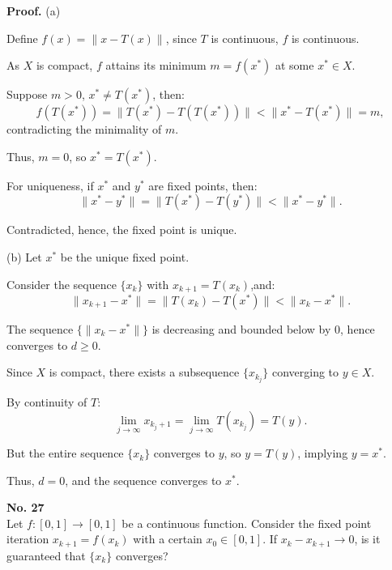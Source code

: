 \documentclass[a4paper, 11pt]{article}
\newenvironment{problem}[2][No.]
    { \begin{mdframed}[backgroundcolor=gray!5] \textbf{#1 #2} \\}
    {  \end{mdframed}}
\newenvironment{solution}
    {\textbf{Proof.}}
    {}
\begin{document}
\begin{solution}
	(a)
	
	Define \( f(x) = \| x - T(x) \| \), since \( T \) is continuous, \( f \) is continuous. 
	
	As \( X \) is compact, \( f \) attains its minimum \( m = f(x^*) \) at some \( x^* \in X \).
	
	Suppose \( m > 0 \),  \( x^* \neq T(x^*) \), then:
	$$
	f(T(x^*)) = \| T(x^*) - T(T(x^*)) \| < \| x^* - T(x^*) \| = m,
	$$
	contradicting the minimality of \( m \). 
	
	Thus, \( m = 0 \), so \( x^* = T(x^*) \).
	
	For uniqueness, if \( x^* \) and \( y^* \) are fixed points, then:
	$$
	\| x^* - y^* \| = \| T(x^*) - T(y^*) \| < \| x^* - y^* \|. 
	$$

	Contradicted, hence, the fixed point is unique.
	
	(b)
	Let \( x^* \) be the unique fixed point. 
	
	Consider the sequence \( \{ x_k \} \) with \( x_{k+1} = T(x_k) \),and:
	$$
	\| x_{k+1} - x^* \| = \| T(x_k) - T(x^*) \| < \| x_k - x^* \|.
	$$
	
	The sequence \( \{ \| x_k - x^* \| \} \) is decreasing and bounded below by 0, hence converges to \( d \geq 0 \).
	
	Since \( X \) is compact, there exists a subsequence \( \{ x_{k_j} \} \) converging to \( y \in X \). 
	
	By continuity of \( T \):
	$$
	\lim_{j \to \infty} x_{k_j+1} = \lim_{j \to \infty} T(x_{k_j}) = T(y).
	$$
	
	But the entire sequence \( \{ x_k \} \) converges to \( y \), so \( y = T(y) \), implying \( y = x^* \). 
	
	Thus, \( d = 0 \), and the sequence converges to \( x^* \).

\end{solution}

\begin{problem}{27}
Let \( f : [0, 1] \to [0, 1] \) be a continuous function. Consider the fixed point iteration \( x_{k+1} = f(x_k) \) with a certain \( x_0 \in [0, 1] \). If \( x_k - x_{k+1} \to 0 \), is it guaranteed that \( \{x_k\} \) converges?

\end{problem}
\end{document}
